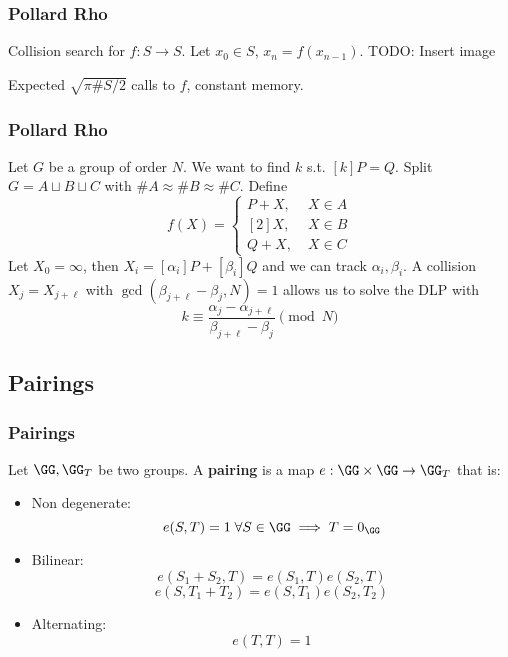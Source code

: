 \documentclass{beamer}
\begin{document}
\begin{frame}
    \frametitle{Pollard Rho}
    Collision search for $f: S \to S$. Let $x_0 \in S$, $x_n = f(x_{n-1})$.
    TODO: Insert image
    
    Expected $\sqrt{\pi \#S/2}$ calls to $f$, constant memory.
\end{frame}

\begin{frame}
    \frametitle{Pollard Rho}
    Let $G$ be a group of order $N$. We want to find $k$ s.t. $[k]P = Q$.
    Split $G = A \sqcup B \sqcup C$ with $\# A \approx \# B \approx \#C$.
    Define 
    \[ f(X) = \begin{cases}
        P + X, \; &X \in A \\
        [2]X, \; &X \in B \\
        Q + X, \; &X \in C
    \end{cases} \]
    Let $X_0 = \infty$, then $X_i = [\alpha_i] P + [\beta_i] Q$ and we can track $\alpha_i, \beta_i$. 
    A collision $X_j = X_{j+\ell}$ with $\gcd(\beta_{j+\ell} - \beta_j, N) = 1$ allows us to solve the DLP with
    \[ k \equiv \frac{\alpha_j - \alpha_{j + \ell}}{\beta_{j+\ell} - \beta_j} \pmod{N} \]

\end{frame}

\subsection{Pairings}
\begin{frame}
    \frametitle{Pairings}
    \begin{definition}
        Let $\GG, \GG_T$ be two groups. A \textbf{pairing} is a map $e: \GG \times \GG \to \GG_T$ that is:
        \begin{itemize}
            \item Non degenerate: 
            \[ e(S, T) = 1 \; \forall S \in \GG \implies T = 0_{\GG}  \]
            \item Bilinear:
            \[ e(S_1 + S_2, T) = e(S_1, T)e(S_2, T)\]
            \[ e(S, T_1 + T_2) = e(S, T_1)e(S_2, T_2)\]
            \item Alternating:
            \[ e(T, T) = 1 \]
            
        \end{itemize}
    \end{definition}
\end{frame}
\end{document}
